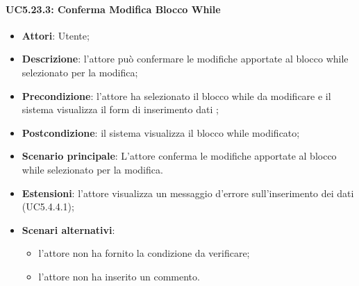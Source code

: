 \begin{itemize}
\begin{itemize}
\begin{itemize}
\begin{itemize}
\paragraph{UC5.23.3: Conferma Modifica Blocco While}
\label{UC5.23.3}
\begin{itemize}
	\item \textbf{Attori}: Utente;
	\item \textbf{Descrizione}: l'attore può confermare le modifiche apportate al blocco while selezionato per la modifica;
	\item \textbf{Precondizione}: l'attore ha selezionato il blocco while da modificare e il sistema visualizza il form di inserimento dati ;
	\item \textbf{Postcondizione}: il sistema visualizza il blocco while modificato;
	\item \textbf{Scenario principale}: L'attore conferma le modifiche apportate al blocco while selezionato per la modifica.
	\item \textbf{Estensioni}: l'attore visualizza un messaggio d'errore sull'inserimento dei dati (UC5.4.4.1);
	\item \textbf{Scenari alternativi}:
	\begin{itemize}
		\item l'attore non ha fornito la condizione da verificare;
		\item l'attore non ha inserito un commento.
	\end{itemize}
\end{itemize}


\end{itemize}
\end{itemize}
\end{itemize}
\end{itemize}

